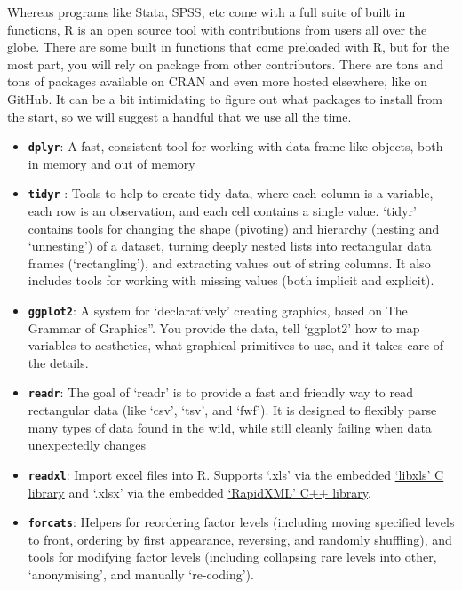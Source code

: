 \documentclass[
  letterpaper,
  DIV=11,
  numbers=noendperiod]{scrreprt}
\providecommand{\tightlist}{%
  \setlength{\itemsep}{0pt}\setlength{\parskip}{0pt}}\usepackage{longtable,booktabs,array}
\begin{document}
Whereas programs like Stata, SPSS, etc come with a full suite of built
in functions, R is an open source tool with contributions from users all
over the globe. There are some built in functions that come preloaded
with R, but for the most part, you will rely on package from other
contributors. There are tons and tons of packages available on CRAN and
even more hosted elsewhere, like on GitHub. It can be a bit intimidating
to figure out what packages to install from the start, so we will
suggest a handful that we use all the time.

\begin{itemize}
\tightlist
\item
  \textbf{\texttt{dplyr}}: A fast, consistent tool for working with data
  frame like objects, both in memory and out of memory
\item
  \textbf{\texttt{tidyr}} : Tools to help to create tidy data, where
  each column is a variable, each row is an observation, and each cell
  contains a single value. `tidyr' contains tools for changing the shape
  (pivoting) and hierarchy (nesting and `unnesting') of a dataset,
  turning deeply nested lists into rectangular data frames
  (`rectangling'), and extracting values out of string columns. It also
  includes tools for working with missing values (both implicit and
  explicit).
\item
  \textbf{\texttt{ggplot2}}: A system for `declaratively' creating
  graphics, based on The Grammar of Graphics''. You provide the data,
  tell `ggplot2' how to map variables to aesthetics, what graphical
  primitives to use, and it takes care of the details.
\item
  \textbf{\texttt{readr}}: The goal of `readr' is to provide a fast and
  friendly way to read rectangular data (like `csv', `tsv', and `fwf').
  It is designed to flexibly parse many types of data found in the wild,
  while still cleanly failing when data unexpectedly changes
\item
  \textbf{\texttt{readxl}}: Import excel files into R. Supports `.xls'
  via the embedded \href{https://github.com/libxls/libxls}{`libxls' C
  library} and `.xlsx' via the embedded
  \href{https://rapidxml.sourceforge.net/}{`RapidXML' C++ library}.
\item
  \textbf{\texttt{forcats}}: Helpers for reordering factor levels
  (including moving specified levels to front, ordering by first
  appearance, reversing, and randomly shuffling), and tools for
  modifying factor levels (including collapsing rare levels into other,
  `anonymising', and manually `re-coding').

\end{itemize}
\end{document}
